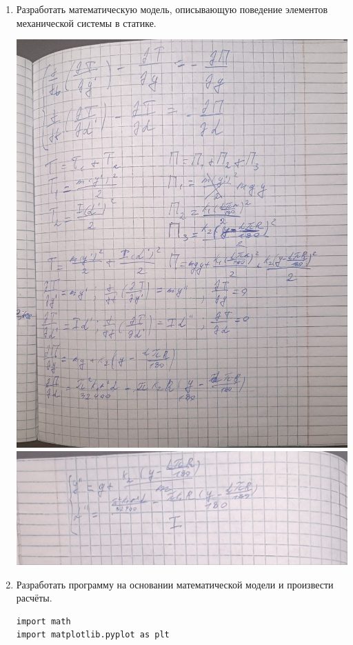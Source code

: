 \documentclass[a4paper,14pt]{extarticle}
\begin{document}
\begin{enumerate}[1. ]
    \item Разработать математическую модель, описывающую поведение элементов механической системы в статике.\\
          \begin{center}
              \includegraphics[width=140mm]{mod1.jpg}
              \includegraphics[width=140mm]{mod2.jpg}
          \end{center}
    \item Разработать программу на основании математической модели и произвести расчёты.
          \begin{verbatim}
import math
import matplotlib.pyplot as plt


\end{verbatim}
\end{enumerate}
\end{document}
